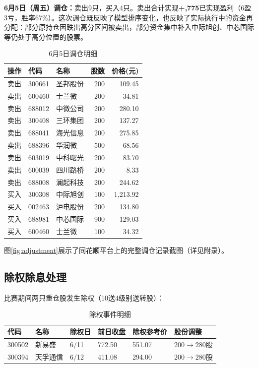 \documentclass[10pt,a4paper]{ctexart}
\begin{document}
\textbf{6月5日（周五）调仓：}卖出9只，买入4只。卖出合计实现\textbf{+,775}已实现盈利（6盈3亏，胜率67\%）。这次调仓既反映了模型排序变化，也反映了实际执行中的资金再分配：部分原持仓因跌出高分区间被卖出，部分资金集中补入中际旭创、中芯国际等仍处于高分位置的股票。

\begin{table}[htbp]
    \centering
    \caption{6月5日调仓明细}
    \footnotesize
    \begin{tabular}{lllrr}
        \toprule
        操作 & 代码 & 名称 & 股数 & 价格(元) \\
        \midrule
        卖出 & 300661 & 圣邦股份 & 200 & 109.45 \\
        卖出 & 600460 & 士兰微 & 200 & 34.81 \\
        卖出 & 688012 & 中微公司 & 200 & 280.10 \\
        卖出 & 300408 & 三环集团 & 200 & 137.27 \\
        卖出 & 688041 & 海光信息 & 200 & 275.85 \\
        卖出 & 688396 & 华润微 & 500 & 68.56 \\
        卖出 & 603019 & 中科曙光 & 200 & 83.70 \\
        卖出 & 600039 & 四川路桥 & 200 & 8.33 \\
        卖出 & 688008 & 澜起科技 & 200 & 244.62 \\
        \midrule
        买入 & 300308 & 中际旭创 & 100 & 1,213.92 \\
        买入 & 002463 & 沪电股份 & 200 & 134.80 \\
        买入 & 688981 & 中芯国际 & 900 & 129.03 \\
        买入 & 600460 & 士兰微 & 100 & 34.32 \\
        \bottomrule
    \end{tabular}
\end{table}

图\ref{fig:adjustment}展示了同花顺平台上的完整调仓记录截图（详见附录）。

\subsection{除权除息处理}

比赛期间两只重仓股发生除权（10送4级别送转股）：

\begin{table}[htbp]
    \centering
    \caption{除权事件明细}
    \begin{tabular}{llllll}
        \toprule
        代码 & 名称 & 除权日 & 前日收盘 & 除权参考价 & 股份调整 \\
        \midrule
        300502 & 新易盛 & 6/11 & 772.50 & 551.07 & $200\to280$股 \\
        300394 & 天孚通信 & 6/12 & 411.08 & 294.00 & $200\to280$股 \\
        \bottomrule
    \end{tabular}
\end{table}
\end{document}
